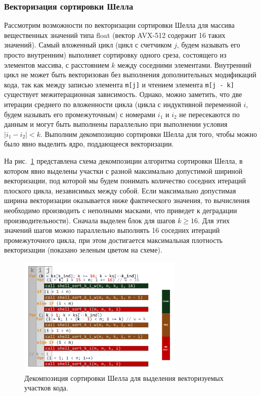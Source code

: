 \subsubsection{Векторизация сортировки Шелла}

Рассмотрим возможности по векторизации сортировки Шелла для массива вещественных значений типа float (вектор AVX-512\label{abbr:avx7} содержит 16 таких значений).
Самый вложенный цикл (цикл с счетчиком $j$, будем называть его просто внутренним) выполняет сортировку одного среза, состоящего из элементов массива, с расстоянием $k$ между соседними элементами.
Внутренний цикл не может быть векторизован без выполнения дополнительных модификаций кода, так как между записью элемента \texttt{m[j]} и чтением элемента \texttt{m[j - k]} существует межитерационная зависимость.
Однако, можно заметить, что две итерации среднего по вложенности цикла (цикла с индуктивной переменной $i$, будем называть его промежуточным) с номерами $i_1$ и $i_2$ не пересекаются по данным и могут быть выполнены параллельно при выполнении условия $|i_1 - i_2| < k$.
Выполним декомпозицию сортировки Шелла для того, чтобы можно было явно выделить ядро, поддающееся векторизации.

На рис.~\ref{fig:text_4_vec_irreg_code_decomp} представлена схема декомпозиции алгоритма сортировки Шелла, в котором явно выделены участки с разной максимально допустимой шириной векторизации\label{term:vec_shir4}, под которой мы будем понимать количество соседних итераций плоского цикла, независимых между собой.
Если максимально допустимая ширина векторизации оказывается ниже фактического значения, то вычисления необходимо производить с неполными масками, что приведет к деградации производительности).
Сначала выделен блок для шагов $k \ge 16$.
Для этих значений шагов можно параллельно выполнять 16 соседних итераций промежуточного цикла, при этом достигается максимальная плотность векторизации (показано зеленым цветом на схеме).

\begin{figure}[ht]
\centering
\includegraphics[width=0.7\textwidth]{./pics/text_4_vec_irreg/code_decomp.pdf}
\singlespacing
{}\caption{Декомпозиция сортировки Шелла для выделения векторизуемых участков кода.}
\label{fig:text_4_vec_irreg_code_decomp}
\end{figure}

